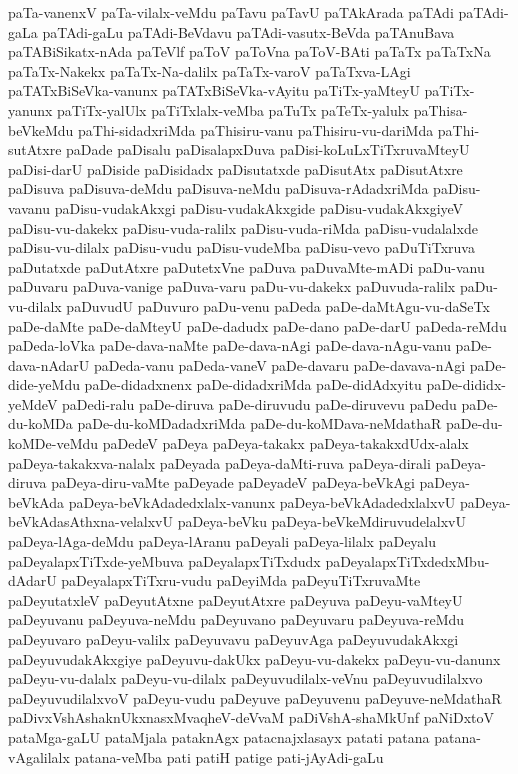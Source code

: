 {paTa-vanenxV
paTa-vilalx-veMdu
paTavu
paTavU
paTAkArada
paTAdi
paTAdi-gaLa
paTAdi-gaLu
paTAdi-BeVdavu
paTAdi-vasutx-BeVda
paTAnuBava
paTABiSikatx-nAda
paTeVlf
paToV
paToVna
paToV-BAti
paTaTx
paTaTxNa
paTaTx-Nakekx
paTaTx-Na-dalilx
paTaTx-varoV
paTaTxva-LAgi
paTATxBiSeVka-vanunx
paTATxBiSeVka-vAyitu
paTiTx-yaMteyU
paTiTx-yanunx
paTiTx-yalUlx
paTiTxlalx-veMba
paTuTx
paTeTx-yalulx
paThisa-beVkeMdu
paThi-sidadxriMda
paThisiru-vanu
paThisiru-vu-dariMda
paThi-sutAtxre
paDade
paDisalu
paDisalapxDuva
paDisi-koLuLxTiTxruvaMteyU
paDisi-darU
paDiside
paDisidadx
paDisutatxde
paDisutAtx
paDisutAtxre
paDisuva
paDisuva-deMdu
paDisuva-neMdu
paDisuva-rAdadxriMda
paDisu-vavanu
paDisu-vudakAkxgi
paDisu-vudakAkxgide
paDisu-vudakAkxgiyeV
paDisu-vu-dakekx
paDisu-vuda-ralilx
paDisu-vuda-riMda
paDisu-vudalalxde
paDisu-vu-dilalx
paDisu-vudu
paDisu-vudeMba
paDisu-vevo
paDuTiTxruva
paDutatxde
paDutAtxre
paDutetxVne
paDuva
paDuvaMte-mADi
paDu-vanu
paDuvaru
paDuva-vanige
paDuva-varu
paDu-vu-dakekx
paDuvuda-ralilx
paDu-vu-dilalx
paDuvudU
paDuvuro
paDu-venu
paDeda
paDe-daMtAgu-vu-daSeTx
paDe-daMte
paDe-daMteyU
paDe-dadudx
paDe-dano
paDe-darU
paDeda-reMdu
paDeda-loVka
paDe-dava-naMte
paDe-dava-nAgi
paDe-dava-nAgu-vanu
paDe-dava-nAdarU
paDeda-vanu
paDeda-vaneV
paDe-davaru
paDe-davava-nAgi
paDe-dide-yeMdu
paDe-didadxnenx
paDe-didadxriMda
paDe-didAdxyitu
paDe-dididx-yeMdeV
paDedi-ralu
paDe-diruva
paDe-diruvudu
paDe-diruvevu
paDedu
paDe-du-koMDa
paDe-du-koMDadadxriMda
paDe-du-koMDava-neMdathaR
paDe-du-koMDe-veMdu
paDedeV
paDeya
paDeya-takakx
paDeya-takakxdUdx-alalx
paDeya-takakxva-nalalx
paDeyada
paDeya-daMti-ruva
paDeya-dirali
paDeya-diruva
paDeya-diru-vaMte
paDeyade
paDeyadeV
paDeya-beVkAgi
paDeya-beVkAda
paDeya-beVkAdadedxlalx-vanunx
paDeya-beVkAdadedxlalxvU
paDeya-beVkAdasAthxna-velalxvU
paDeya-beVku
paDeya-beVkeMdiruvudelalxvU
paDeya-lAga-deMdu
paDeya-lAranu
paDeyali
paDeya-lilalx
paDeyalu
paDeyalapxTiTxde-yeMbuva
paDeyalapxTiTxdudx
paDeyalapxTiTxdedxMbu-dAdarU
paDeyalapxTiTxru-vudu
paDeyiMda
paDeyuTiTxruvaMte
paDeyutatxleV
paDeyutAtxne
paDeyutAtxre
paDeyuva
paDeyu-vaMteyU
paDeyuvanu
paDeyuva-neMdu
paDeyuvano
paDeyuvaru
paDeyuva-reMdu
paDeyuvaro
paDeyu-valilx
paDeyuvavu
paDeyuvAga
paDeyuvudakAkxgi
paDeyuvudakAkxgiye
paDeyuvu-dakUkx
paDeyu-vu-dakekx
paDeyu-vu-danunx
paDeyu-vu-dalalx
paDeyu-vu-dilalx
paDeyuvudilalx-veVnu
paDeyuvudilalxvo
paDeyuvudilalxvoV
paDeyu-vudu
paDeyuve
paDeyuvenu
paDeyuve-neMdathaR
paDivxVshAshaknUkxnasxMvaqheV-deVvaM
paDiVshA-shaMkUnf
paNiDxtoV
pataMga-gaLU
pataMjala
pataknAgx
patacnajxlasayx
patati
patana
patana-vAgalilalx
patana-veMba
pati
patiH
patige
pati-jAyAdi-gaLu
}
